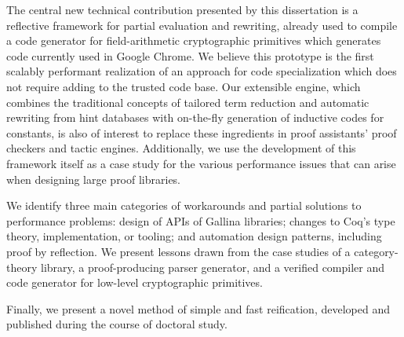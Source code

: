 The central new technical contribution presented by this dissertation is a reflective framework for partial evaluation and rewriting, already used to compile a code generator for field-arithmetic cryptographic primitives which generates code currently used in Google Chrome.
We believe this prototype is the first scalably performant realization of an approach for code specialization which does not require adding to the trusted code base.
Our extensible engine, which combines the traditional concepts of tailored term reduction and automatic rewriting from hint databases with on-the-fly generation of inductive codes for constants, is also of interest to replace these ingredients in proof assistants' proof checkers and tactic engines.
Additionally, we use the development of this framework itself as a case study for the various performance issues that can arise when designing large proof libraries.

We identify three main categories of workarounds and partial solutions to performance problems: design of APIs of Gallina libraries; changes to Coq's type theory, implementation, or tooling; and automation design patterns, including proof by reflection.
We present lessons drawn from the case studies of a category-theory library, a proof-producing parser generator, and a verified compiler and code generator for low-level cryptographic primitives.

Finally, we present a novel method of simple and fast reification, developed and published during the course of doctoral study.
